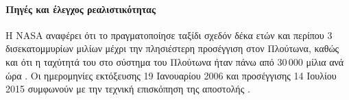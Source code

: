 \paragraph{Πηγές και έλεγχος ρεαλιστικότητας}
Η NASA αναφέρει ότι το  πραγματοποίησε ταξίδι σχεδόν
δέκα ετών και περίπου \(3\) δισεκατομμυρίων μιλίων μέχρι την
πλησιέστερη προσέγγιση στον Πλούτωνα, καθώς και ότι η ταχύτητά του στο
σύστημα του Πλούτωνα ήταν πάνω από \(30\,000\) μίλια ανά ώρα
\cite{nasaNewHorizonsPlutoEncounter}. Οι ημερομηνίες εκτόξευσης
19 Ιανουαρίου 2006 και προσέγγισης 14 Ιουλίου 2015 συμφωνούν με την
τεχνική επισκόπηση της αποστολής \cite{stern2007newHorizonsOverview}.
